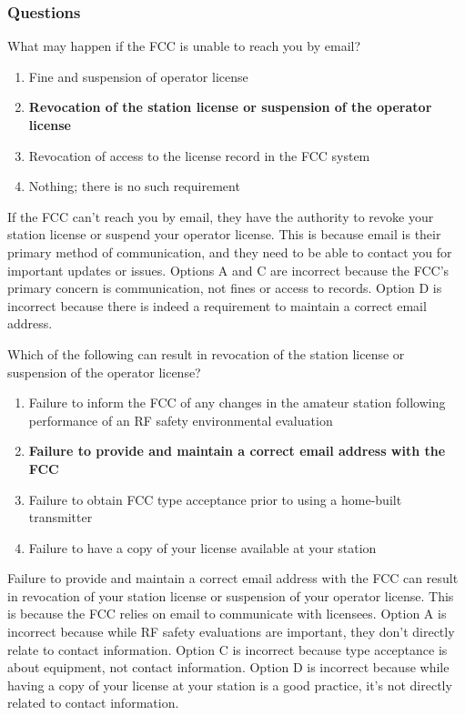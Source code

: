 \subsubsection{Questions}

\begin{tcolorbox}[colback=gray!10!white,colframe=black!75!black,title={T1C04}]
What may happen if the FCC is unable to reach you by email?
\begin{enumerate}[label=\Alph*),noitemsep]
    \item Fine and suspension of operator license
    \item \textbf{Revocation of the station license or suspension of the operator license}
    \item Revocation of access to the license record in the FCC system
    \item Nothing; there is no such requirement
\end{enumerate}
\end{tcolorbox}

If the FCC can’t reach you by email, they have the authority to revoke your station license or suspend your operator license. This is because email is their primary method of communication, and they need to be able to contact you for important updates or issues. Options A and C are incorrect because the FCC’s primary concern is communication, not fines or access to records. Option D is incorrect because there is indeed a requirement to maintain a correct email address.

\begin{tcolorbox}[colback=gray!10!white,colframe=black!75!black,title={T1C07}]
Which of the following can result in revocation of the station license or suspension of the operator license?
\begin{enumerate}[label=\Alph*),noitemsep]
    \item Failure to inform the FCC of any changes in the amateur station following performance of an RF safety environmental evaluation
    \item \textbf{Failure to provide and maintain a correct email address with the FCC}
    \item Failure to obtain FCC type acceptance prior to using a home-built transmitter
    \item Failure to have a copy of your license available at your station
\end{enumerate}
\end{tcolorbox}

Failure to provide and maintain a correct email address with the FCC can result in revocation of your station license or suspension of your operator license. This is because the FCC relies on email to communicate with licensees. Option A is incorrect because while RF safety evaluations are important, they don’t directly relate to contact information. Option C is incorrect because type acceptance is about equipment, not contact information. Option D is incorrect because while having a copy of your license at your station is a good practice, it’s not directly related to contact information.
